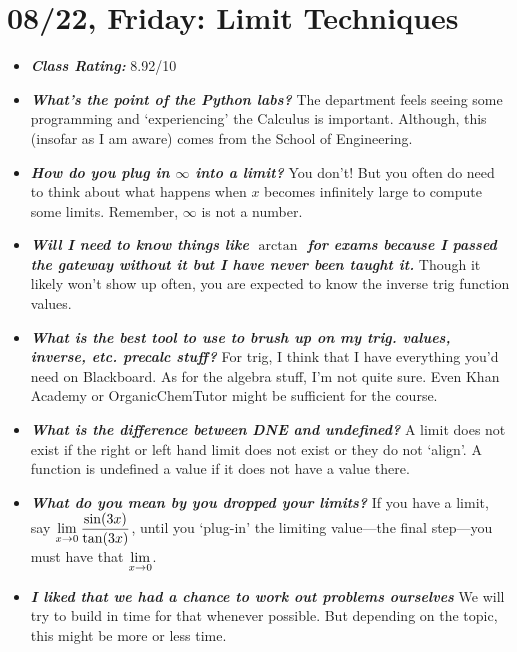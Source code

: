 \documentclass[11pt,letterpaper]{article}
\begin{document}
\newpage
\section*{08/22, Friday: Limit Techniques\label{08-22}}

\begin{itemize}
\item {\bfseries\itshape Class Rating:} 8.92/10

\item {\bfseries\itshape What's the point of the Python labs?} The department feels seeing some programming and `experiencing' the Calculus is important. Although, this (insofar as I am aware) comes from the School of Engineering. 

\item {\bfseries\itshape How do you plug in $\infty$ into a limit?} You don't! But you often do need to think about what happens when $x$ becomes infinitely large to compute some limits. Remember, $\infty$ is not a number. 

\item {\bfseries\itshape Will I need to know things like $\arctan$ for exams because I passed the gateway without it but I have never been taught it.} Though it likely won't show up often, you are expected to know the inverse trig function values. 

\item {\bfseries\itshape What is the best tool to use to brush up on my trig. values, inverse, etc. precalc stuff?} For trig, I think that I have everything you'd need on Blackboard. As for the algebra stuff, I'm not quite sure. Even Khan Academy or OrganicChemTutor might be sufficient for the course. 

\item {\bfseries\itshape What is the difference between DNE and undefined?} A limit does not exist if the right or left hand limit does not exist or they do not `align'. A function is undefined a value if it does not have a value there. 

\item {\bfseries\itshape What do you mean by you dropped your limits?} If you have a limit, say $\displaystyle\lim_{x \to 0} \dfrac{\sin(3x)}{\tan(3x)}$, until you `plug-in' the limiting value---the final step---you must have that $\displaystyle\lim_{x \to 0}$.

\item {\bfseries\itshape I liked that we had a chance to work out problems ourselves} We will try to build in time for that whenever possible. But depending on the topic, this might be more or less time. 


\end{itemize}
\end{document}

